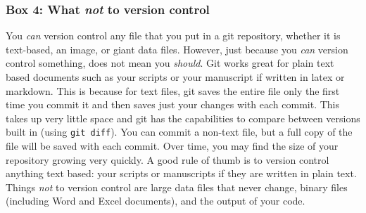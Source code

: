 \subsubsection{Box 4: What \textit{not} to version control}

You \textit{can} version control any file that you put in a git repository, whether it is text-based, an image, or giant data files. However, just because you \textit{can} version control something, does not mean you \textit{should}. Git works great for plain text based documents such as your scripts or your manuscript if written in latex or markdown. This is because for text files, git saves the entire file only the first time you commit it and then saves just your changes with each commit. This takes up very little space and git has the capabilities to compare between versions built in (using \verb|git diff|). You can commit a non-text file, but a full copy of the file will be saved with each commit. Over time, you may find the size of your repository growing very quickly. A good rule of thumb is to version control anything text based: your scripts or manuscripts if they are written in plain text. Things \textit{not} to version control are large data files that never change, binary files (including Word and Excel documents), and the output of your code. 
